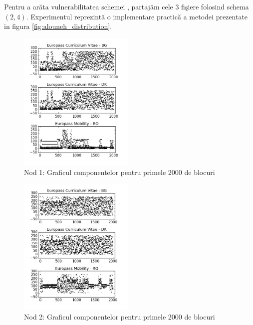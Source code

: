\documentclass{llncs}
\begin{document}
Pentru a ar\u{a}ta vulnerabilitatea schemei {\cite{AAMK:2013}}, partaj\u{a}m cele $3$ fi\c{s}iere folosind schema $(2, 4)$. Experimentul reprezint\u{a} o implementare practic\u{a} a metodei prezentate in figura {\ref{fig:alouneh_distribution}}.



\begin{figure}[H]
\begin{center}{}
\includegraphics[width=0.49\textwidth]{img/db1.png}    %
\caption{Nod 1: Graficul componentelor pentru primele 2000 de blocuri} 
\label{fig:db1}
\end{center}
\end{figure}

\begin{figure}
\begin{center}
\includegraphics[width=0.49\textwidth]{img/db2.png}    %
\caption{Nod 2: Graficul componentelor pentru primele 2000 de blocuri} 
\label{fig:db2}
\end{center}
\end{figure}
\end{document}
